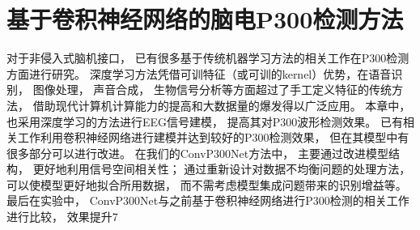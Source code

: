 \chapter{基于卷积神经网络的脑电P300检测方法}

对于非侵入式脑机接口， 已有很多基于传统机器学习方法的相关工作在P300检测方面进行研究。 深度学习方法凭借可训特征（或可训的kernel）优势，在语音识别， 图像处理， 声音合成， 生物信号分析等方面超过了手工定义特征的传统方法， 借助现代计算机计算能力的提高和大数据量的爆发得以广泛应用。 本章中， 也采用深度学习的方法进行EEG信号建模， 提高其对P300波形检测效果。 已有相关工作利用卷积神经网络进行建模并达到较好的P300检测效果， 但在其模型中有很多部分可以进行改进。 在我们的ConvP300Net方法中， 主要通过改进模型结构， 更好地利用信号空间相关性； 通过重新设计对数据不均衡问题的处理方法， 可以使模型更好地拟合所用数据， 而不需考虑模型集成问题带来的识别增益等。 最后在实验中， ConvP300Net与之前基于卷积神经网络进行P300检测的相关工作进行比较， 效果提升7%





